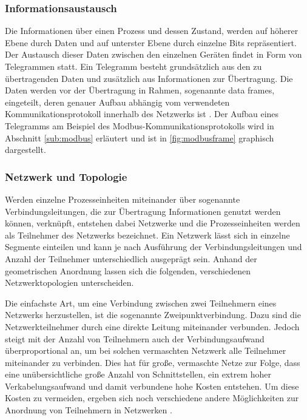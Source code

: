 \subsubsection{Informationsaustausch}

Die Informationen über einen Prozess und dessen Zustand, werden auf höherer Ebene durch Daten und auf unterster Ebene durch einzelne Bits repräsentiert. Der Austausch dieser Daten zwischen den einzelnen Geräten findet in Form von Telegrammen statt. Ein Telegramm besteht grundsätzlich aus den zu übertragenden Daten und zusätzlich aus Informationen zur Übertragung. Die Daten werden vor der Übertragung in Rahmen, sogenannte data frames, eingeteilt, deren genauer Aufbau abhängig vom verwendeten Kommunikationsprotokoll innerhalb des Netzwerks ist \cite[S.~11f.]{schn06}. Der Aufbau eines Telegramms am Beispiel des Modbus-Kommunikationsprotokolls wird in Abschnitt \ref{sub:modbus} erläutert und ist in \ref{fig:modbusframe} graphisch dargestellt.

\subsubsection{Netzwerk und Topologie}

Werden einzelne Prozesseinheiten miteinander über sogenannte Verbindungsleitungen, die zur Übertragung Informationen genutzt werden können, verknüpft, entstehen dabei Netzwerke und die Prozesseinheiten werden als Teilnehmer des Netzwerks bezeichnet. Ein Netzwerk lässt sich in einzelne Segmente einteilen und kann je nach Ausführung der Verbindungsleitungen und Anzahl der Teilnehmer unterschiedlich ausgeprägt sein. Anhand der geometrischen Anordnung lassen sich die folgenden, verschiedenen Netzwerktopologien unterscheiden.


Die einfachste Art, um eine Verbindung zwischen zwei Teilnehmern eines Netzwerks herzustellen, ist die sogenannte Zweipunktverbindung. Dazu sind die Netzwerkteilnehmer durch eine direkte Leitung miteinander verbunden. Jedoch steigt mit der Anzahl von Teilnehmern auch der Verbindungsaufwand überproportional an, um bei solchen vermaschten Netzwerk alle Teilnehmer miteinander zu verbinden. Dies hat für große, vermaschte Netze zur Folge, dass eine unübersichtliche große Anzahl von Schnittstellen, ein extrem hoher Verkabelungsaufwand und damit verbundene hohe Kosten entstehen. Um diese Kosten zu vermeiden, ergeben sich noch verschiedene andere Möglichkeiten zur Anordnung von Teilnehmern in Netzwerken \cite[S.~1f.]{schn06}.


